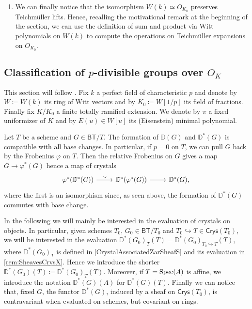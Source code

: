 \begin{rem}[]
\begin{enumerate}
\item We can finally notice that the isomorphism $W(k) \simeq O_{K_0}$ preserves
	Teichmüller lifts. Hence, recalling the motivational remark at the beginning
	of the section, we can use the definition of sum and product via
	Witt polynomials on $W(k)$ to compute the operations on
	Teichmüller expansions on $O_{K_0}$.
\end{enumerate}
\end{rem}



\subsection{Classification of \texorpdfstring{$p$}{p}-divisible groups
	over \texorpdfstring{$O_{ K }$}{the ring of integers of K}}
This section will follow \cite[Appendix A]{Kisin}.
Fix $k$ a perfect field of characteristic $p$ and denote by
$W \coloneqq W(k)$ its ring of Witt vectors and by $K_0 \coloneqq W[1/p]$
its field of fractions.
Finally fix $K/K_0$ a finite totally ramified extension.
We denote by $\pi$ a fixed uniformizer of $K$ and by $E(u) \in W[u]$
its (Eisenstein) minimal polynomial.


\begin{rem}[]
	Let $T$ be a scheme and $G \in \mathsf{BT}/T$.
	The formation of $\mathbb{D}(G)$ and $\mathbb{D}^*(G)$ is compatible with all base changes.
	In particular, if $p = 0$ on $T$, we can pull $G$ back by the Frobenius $\varphi$ on $T$.
	Then the relative Frobenius on $G$ gives a map $G \to \varphi^*(G)$
	hence a map of crystals
	\begin{equation*}
	\begin{tikzcd}
		\varphi^* (\mathbb{D}^*(G)) \arrow[r, "\sim", rightarrow] &
		\mathbb{D}^*(\varphi^*(G)) \arrow[r, "", rightarrow] &
		\mathbb{D}^*(G)
	,\end{tikzcd}
	\end{equation*}
	where the first is an isomorphism since, as seen above, the formation of
	$\mathbb{D}^*(G)$ commutes with base change.
\end{rem}


\begin{ntt}[]
	In the following we will mainly be interested in the evaluation of
	crystals on objects.
	In particular, given schemes $T_0$, $G_0 \in \mathsf{BT}/T_0$ and 
	$T_0 \hookrightarrow T \in \mathsf{Crys}(T_0)$, we will be interested in the
	evaluation $\mathbb{D}^*(G_0)_{T}(T) = \mathbb{D}^*(G_0)_{T_0 \hookrightarrow T}(T)$,
	where $\mathbb{D}^*(G_0)_T$ is defined in \cref{CrystalAssociatedZarSheafS}
	and its evaluation in \cref{rem:SheavesCrysX}.
	Hence we introduce the shorter
	$\mathbb{D}^*(G_0)(T) \coloneqq \mathbb{D}^*(G_0)_T(T)$.
	Moreover, if $T = \operatorname{Spec}(A)$ is affine, we introduce the notation
	$\mathbb{D}^*(G)(A)$ for $\mathbb{D}^*(G)(T)$.
	Finally we can notice that, fixed $G$, the functor $\mathbb{D}^*(G)$,
	induced by a sheaf on $\mathsf{Crys}(T_0)$,
	is contravariant when evaluated on schemes, but covariant on rings.
\end{ntt}


